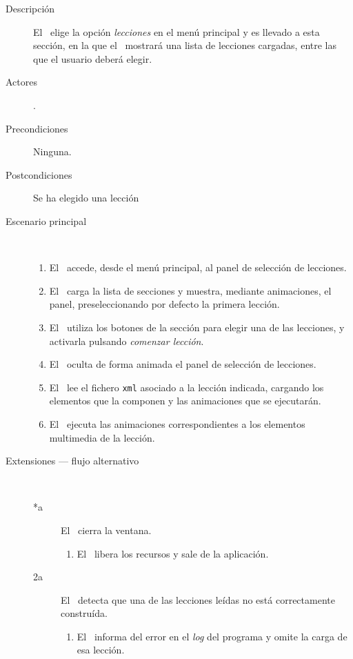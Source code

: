 \begin{description}
\item [Descripción] El \jugador\ elige la opción \textit{lecciones} en el menú
  principal y es llevado a esta sección, en la que el \sistema\ mostrará una
  lista de lecciones cargadas, entre las que el usuario deberá elegir.
\item [Actores] \jugador.
\item [Precondiciones] Ninguna.
\item [Postcondiciones] Se ha elegido una lección
\item [Escenario principal] $\quad$
  \begin{enumerate}
  \item El \jugador\ accede, desde el menú principal, al panel de selección de lecciones.
  \item El \sistema\ carga la lista de secciones y muestra, mediante
    animaciones, el panel, preseleccionando por defecto la primera lección.
  \item El \jugador\ utiliza los botones de la sección para elegir una de las
    lecciones, y activarla pulsando \textit{comenzar lección}.
  \item El \sistema\ oculta de forma animada el panel de selección de lecciones.
  \item El \sistema\ lee el fichero \texttt{xml} asociado a la lección indicada,
    cargando los elementos que la componen y las animaciones que se ejecutarán.
  \item El \sistema\ ejecuta las animaciones correspondientes a los elementos
    multimedia de la lección.
  \end{enumerate}
\item[Extensiones --- flujo alternativo] $\quad$
  \begin{description}

  \item [*a] El \jugador\ cierra la ventana.
    \begin{enumerate}
    \item El \sistema\ libera los recursos y sale de la aplicación.
    \end{enumerate}

  \item[2a] El \sistema\ detecta que una de las lecciones leídas no está
    correctamente construída.
    \begin{enumerate}
    \item El \sistema\ informa del error en el \textit{log} del programa y omite
      la carga de esa lección.
    \end{enumerate}


\end{description}
\end{description}
